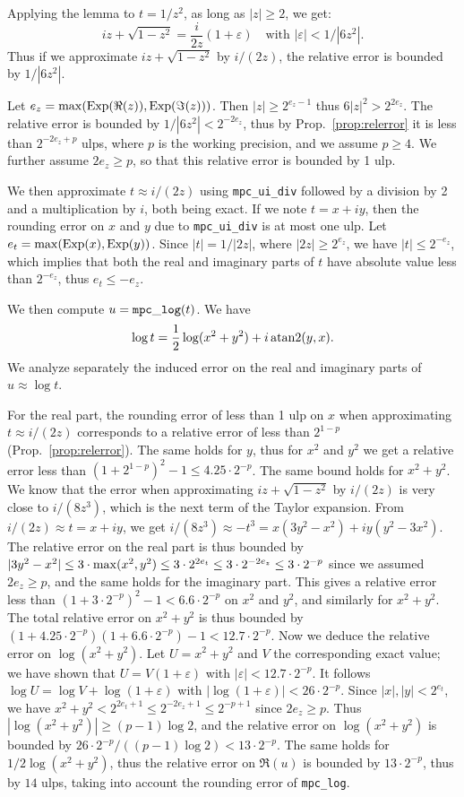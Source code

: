 \documentclass [11pt]{article}
\DeclareMathOperator{\Exp}{\operatorname {Exp}}
\renewcommand {\geq}{\geqslant}
\begin{document}
Applying the lemma to $t = 1/z^2$, as long as $|z| \geq 2$, we get:
\[ iz + \sqrt{1-z^2} = \frac{i}{2z} (1 + \varepsilon) \quad
  \mbox{with $|\varepsilon| < 1/|6z^2|$.} \]
Thus if we approximate $iz + \sqrt{1-z^2}$ by $i/(2z)$,
the relative error is bounded by $1/|6z^2|$.

Let $e_z = {\rm max}(\Exp(\Re(z)),\Exp(\Im(z)))$.
Then $|z| \ge 2^{e_z-1}$ thus $6 |z|^2 > 2^{2e_z}$.
The relative error is bounded by $1/|6z^2| < 2^{-2e_z}$,
thus by Prop.~\ref{prop:relerror} it is less than $2^{-2e_z+p}$ ulps,
where $p$ is the working precision, and we assume $p \ge 4$.
We further assume $2e_z \ge p$, so that this relative error is bounded
by 1 ulp.

We then approximate $t \approx i/(2z)$ using \verb|mpc_ui_div| followed by
a division by 2 and a multiplication by $i$, both being exact.
If we note $t = x + iy$, then the rounding error on $x$ and $y$ due
to \verb|mpc_ui_div| is at most one ulp.
Let $e_t = {\rm max}(\Exp(x), \Exp(y))$.
Since $|t| = 1/|2z|$, where $|2z| \ge 2^{e_z}$, we have
$|t| \le 2^{-e_z}$, which implies that both the real and imaginary parts
of $t$ have absolute value less than $2^{-e_z}$, thus
$e_t \le -e_z$.

We then compute $u = {\tt mpc\_log}(t)$.
We have
\[ \log t = \frac{1}{2} \log(x^2+y^2) + i \, {\rm atan2}(y,x). \]
We analyze separately the induced error on the real and imaginary parts
of $u \approx \log t$.

For the real part, the rounding error of less than 1 ulp on $x$ when
approximating $t \approx i/(2z)$ corresponds to a relative error of
less than $2^{1-p}$ (Prop.~\ref{prop:relerror}).
The same holds for $y$, thus for $x^2$ and $y^2$ we get a relative error
less than $(1 + 2^{1-p})^2-1 \le 4.25 \cdot 2^{-p}$.
The same bound holds for $x^2+y^2$.
We know that the error when approximating
$iz + \sqrt{1-z^2}$ by $i/(2z)$ is very close to $i/(8z^3)$,
which is the next term of the Taylor expansion.
From $i/(2z) \approx t = x+iy$, we get $i/(8z^3) \approx -t^3 =
x (3y^2-x^2) + i y (y^2-3x^2)$.
The relative error on the real part is thus bounded by
$|3y^2-x^2| \le 3 \cdot {\rm max}(x^2,y^2) \le 3 \cdot 2^{2e_t} \le 3 \cdot 2^{-2e_z}
\le 3 \cdot 2^{-p}$ since we assumed $2e_z \ge p$,
and the same holds for the imaginary part.
This gives a relative error less than $(1 + 3 \cdot 2^{-p})^2 - 1 < 6.6 \cdot 2^{-p}$
on $x^2$ and $y^2$, and similarly for $x^2+y^2$.
The total relative error on $x^2+y^2$ is thus bounded by
$(1 + 4.25 \cdot 2^{-p}) (1 + 6.6 \cdot 2^{-p}) - 1 < 12.7 \cdot 2^{-p}$.
Now we deduce the relative error on $\log(x^2+y^2)$.
Let $U = x^2+y^2$ and $V$ the corresponding exact value;
we have shown that $U = V (1 + \varepsilon)$ with
$|\varepsilon| < 12.7 \cdot 2^{-p}$.
It follows $\log U = \log V + \log(1 + \varepsilon)$
with $|\log(1 + \varepsilon)| < 26 \cdot 2^{-p}$.
Since $|x|, |y| < 2^{e_t}$, we have $x^2+y^2 < 2^{2e_t+1} \le 2^{-2e_z+1}
\le 2^{-p+1}$ since $2e_z \ge p$.
Thus $|\log(x^2+y^2)| \ge (p-1) \log 2$,
and the relative error on $\log(x^2+y^2)$ is bounded by
$26 \cdot 2^{-p}/((p-1) \log 2) < 13 \cdot 2^{-p}$.
The same holds for $1/2 \log(x^2+y^2)$, thus the relative error on $\Re(u)$
is bounded by $13 \cdot 2^{-p}$, thus by $14$ ulps, taking into account
the rounding error of \verb|mpc_log|.
\end{document}
